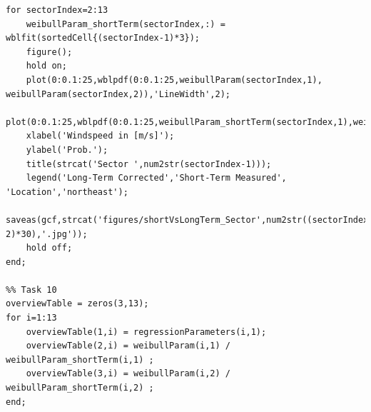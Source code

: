 \documentclass[10pt]{article}
\begin{document}
\begin{lstlisting}
for sectorIndex=2:13
    weibullParam_shortTerm(sectorIndex,:) = wblfit(sortedCell{(sectorIndex-1)*3});
    figure();
    hold on;
    plot(0:0.1:25,wblpdf(0:0.1:25,weibullParam(sectorIndex,1), weibullParam(sectorIndex,2)),'LineWidth',2);
    plot(0:0.1:25,wblpdf(0:0.1:25,weibullParam_shortTerm(sectorIndex,1),weibullParam_shortTerm(sectorIndex,2)),'LineWidth',2);
    xlabel('Windspeed in [m/s]');
    ylabel('Prob.');
    title(strcat('Sector ',num2str(sectorIndex-1)));
    legend('Long-Term Corrected','Short-Term Measured', 'Location','northeast');
    saveas(gcf,strcat('figures/shortVsLongTerm_Sector',num2str((sectorIndex-2)*30),'.jpg'));
    hold off; 
end;

%% Task 10
overviewTable = zeros(3,13);
for i=1:13
    overviewTable(1,i) = regressionParameters(i,1);
    overviewTable(2,i) = weibullParam(i,1) / weibullParam_shortTerm(i,1) ;
    overviewTable(3,i) = weibullParam(i,2) / weibullParam_shortTerm(i,2) ;
end;
\end{lstlisting}
\end{document}
